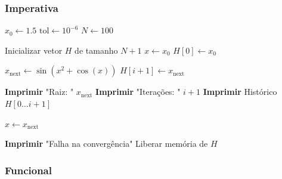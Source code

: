 \subsubsection{Imperativa}

\begin{algorithm}[H]
    \caption{Método do Ponto Fixo Iterativo}
    \label{alg:pontofixo_imperativo}
    \begin{algorithmic}[1]
        \State $x_0 \gets 1.5$ 
        \State $\text{tol} \gets 10^{-6}$ 
        \State $N \gets 100$ 

        \State Inicializar vetor $H$ de tamanho $N+1$ 
        \State $x \gets x_0$
        \State $H[0] \gets x_0$

        \State $x_{\text{next}} \gets \sin(x^2 + \cos(x))$ 
        \State $H[i+1] \gets x_{\text{next}}$ 

        \State \textbf{Imprimir} "Raiz: " $x_{\text{next}}$
        \State \textbf{Imprimir} "Iterações: " $i+1$
        \State \textbf{Imprimir} Histórico $H[0 \dots i+1]$
        \State {} 
        \EndIf

        \State $x \gets x_{\text{next}}$ 
        \EndFor

        \State \textbf{Imprimir} "Falha na convergência"
        \State Liberar memória de $H$
        \State {}
        \EndProcedure
    \end{algorithmic}
\end{algorithm}

\subsubsection{Funcional}

